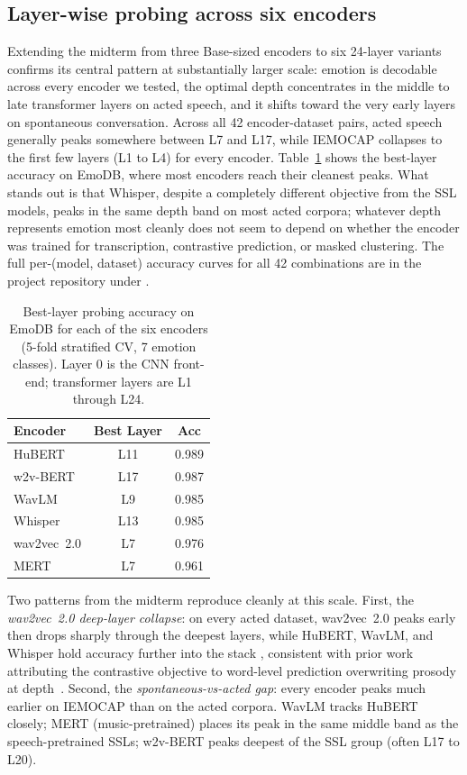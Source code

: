 \documentclass[sigconf,screen]{acmart}
\begin{document}
\subsection{Layer-wise probing across six encoders}
\label{sec:probing}
Extending the midterm from three Base-sized encoders to six 24-layer variants confirms its central pattern at substantially larger scale: emotion is decodable across every encoder we tested, the optimal depth concentrates in the middle to late transformer layers on acted speech, and it shifts toward the very early layers on spontaneous conversation. Across all 42 encoder-dataset pairs, acted speech generally peaks somewhere between L7 and L17, while IEMOCAP collapses to the first few layers (L1 to L4) for every encoder. Table~\ref{tab:probe_peak} shows the best-layer accuracy on EmoDB, where most encoders reach their cleanest peaks. What stands out is that Whisper, despite a completely different objective from the SSL models, peaks in the same depth band on most acted corpora; whatever depth represents emotion most cleanly does not seem to depend on whether the encoder was trained for transcription, contrastive prediction, or masked clustering. The full per-(model, dataset) accuracy curves for all 42 combinations are in the project repository under .
\begin{table}[h]
\centering
\small
\caption{Best-layer probing accuracy on EmoDB for each of the six encoders (5-fold stratified CV, 7 emotion classes). Layer 0 is the CNN front-end; transformer layers are L1 through L24.}
\label{tab:probe_peak}
\begin{tabular}{lcc}
\toprule
\textbf{Encoder} & \textbf{Best Layer} & \textbf{Acc} \\
\midrule
HuBERT      & L11 & 0.989 \\
w2v-BERT    & L17 & 0.987 \\
WavLM       & L9  & 0.985 \\
Whisper     & L13 & 0.985 \\
wav2vec~2.0 & L7  & 0.976 \\
MERT        & L7  & 0.961 \\
\bottomrule
\end{tabular}
\end{table}
Two patterns from the midterm reproduce cleanly at this scale. First, the \emph{wav2vec~2.0 deep-layer collapse}: on every acted dataset, wav2vec~2.0 peaks early then drops sharply through the deepest layers, while HuBERT, WavLM, and Whisper hold accuracy further into the stack , consistent with prior work attributing the contrastive objective to word-level prediction overwriting prosody at depth~\cite{huo2025iterative}. Second, the \emph{spontaneous-vs-acted gap}: every encoder peaks much earlier on IEMOCAP than on the acted corpora. WavLM tracks HuBERT closely; MERT (music-pretrained) places its peak in the same middle band as the speech-pretrained SSLs; w2v-BERT peaks deepest of the SSL group (often L17 to L20).
\end{document}
